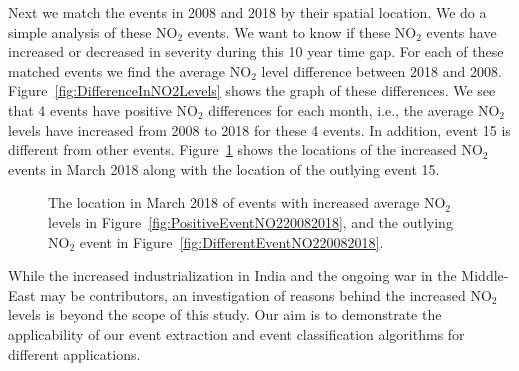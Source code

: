 \documentclass[a4paper,11pt]{article}
\begin{document}
Next we match the events in 2008 and 2018 by their spatial location. We do a simple analysis of these $\text{NO}_2$ events. We want to know if these $\text{NO}_2$ events have increased or decreased in severity during this 10 year time gap. For each of these matched events we find the average $\text{NO}_2$ level difference between 2018 and 2008. Figure~\ref{fig:DifferenceInNO2Levels} shows the graph of these differences. We see that 4 events have positive $\text{NO}_2$ differences for each month, i.e., the average $\text{NO}_2$ levels have increased from 2008 to 2018 for these 4 events. In addition, event 15 is different from other events. Figure~\ref{fig:PositiveDifferentEventsNO220082018} shows the locations of the increased $\text{NO}_2$ events in March 2018 along with the location of the outlying event 15.

\begin{figure}
	\centering
	\caption{The location in March 2018 of events with increased average $\text{NO}_2$ levels in Figure~\ref{fig:PositiveEventNO220082018}, and the outlying $\text{NO}_2$ event in Figure~\ref{fig:DifferentEventNO220082018}.}
	\label{fig:PositiveDifferentEventsNO220082018}
\end{figure}

While the increased industrialization in India and the ongoing war in the Middle-East  may be contributors, an investigation of reasons behind the increased $\text{NO}_2$ levels is beyond the scope of this study. Our aim is to demonstrate the applicability of our event extraction and event classification algorithms for different applications.
\end{document}
